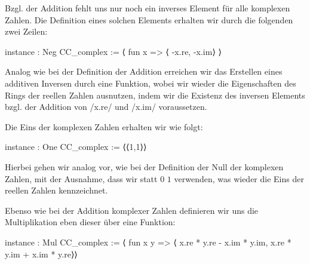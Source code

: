 \documentclass[10pt]{article}
\begin{document}
\noindent Bzgl. der Addition fehlt uns nur noch ein inverses Element für alle komplexen Zahlen. Die Definition eines solchen Elements erhalten wir durch die folgenden zwei Zeilen:
\vspace{-0.1cm}
\begin{leancode}
instance : Neg CC_complex :=
  ⟨ fun x => ⟨ -x.re, -x.im⟩ ⟩
\end{leancode}
\vspace{-0.1cm}
Analog wie bei der Definition der Addition erreichen wir das Erstellen eines additiven Inversen durch eine Funktion, wobei wir wieder die Eigenschaften des Rings der reellen Zahlen ausnutzen, indem wir die Existenz des inversen Elements bzgl. der Addition von \lean/x.re/ und \lean/x.im/ voraussetzen.

\noindent Die Eins der komplexen Zahlen erhalten wir wie folgt:
\vspace{-0.1cm}
\begin{leancode}
instance : One CC_complex :=
    ⟨⟨1,1⟩⟩
\end{leancode}
\vspace{-0.1cm}
\noindent Hierbei gehen wir analog vor, wie bei der Definition der Null der komplexen Zahlen, mit der Ausnahme, dass wir statt $0$ $1$ verwenden, was wieder die Eins der reellen Zahlen kennzeichnet.

\noindent Ebenso wie bei der Addition komplexer Zahlen definieren wir uns die Multiplikation eben dieser über eine Funktion:
\vspace{-0.1cm}
\begin{leancode}
instance : Mul CC_complex :=
  ⟨ fun x y  =>   ⟨ x.re * y.re - x.im * y.im, x.re * y.im + x.im * y.re⟩⟩
\end{leancode}
\vspace{-0.1cm}

\end{document}
